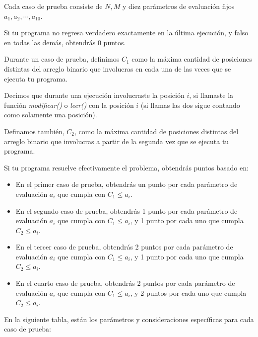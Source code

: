 \documentclass[12pt]{scrartcl}
\begin{document}
        Cada caso de prueba consiste de $N, M$ y diez parámetros de evaluación fijos $a_1, a_2, \cdots, a_{10}$.

        Si tu programa no regresa verdadero exactamente en la última ejecución, y falso en todas las demás, obtendrás 0 puntos.

        Durante un caso de prueba, definimos $C_1$ como la máxima cantidad de posiciones distintas del arreglo binario que involucras en cada una de las veces que se ejecuta tu programa. 
        
        Decimos que durante una ejecución involucraste la posición $i$, si llamaste la función {\itshape modificar()} o {\itshape leer()} con la posición $i$ (si llamas las dos sigue contando como solamente una posición). 
        
        Definamos también, $C_2$, como la máxima cantidad de posiciones distintas del arreglo binario que involucras a partir de la segunda vez que se ejecuta tu programa.
        
        Si tu programa resuelve efectivamente el problema, obtendrás puntos basado en:
        
        
        \begin{itemize}
            \item En el primer caso de prueba, obtendrás un punto por cada parámetro de evaluación $a_i$ que cumpla con $C_1 \le a_i$.
            \item En el segundo caso de prueba, obtendrás 1 punto por cada parámetro de evaluación $a_i$ que cumpla con $C_1 \le a_i$, y 1 punto por cada uno que cumpla $C_2 \le a_i$.
            \item En el tercer caso de prueba, obtendrás 2 puntos por cada parámetro de evaluación $a_i$ que cumpla con $C_1 \le a_i$, y 1 punto por cada uno que cumpla $C_2 \le a_i$.
            \item En el cuarto caso de prueba, obtendrás 2 puntos por cada parámetro de evaluación $a_i$ que cumpla con $C_1 \le a_i$, y 2 puntos por cada uno que cumpla $C_2 \le a_i$.
            
        \end{itemize}


        En la siguiente tabla, están los parámetros y consideraciones específicas para cada caso de prueba:
        
        \null
        
\end{document}
